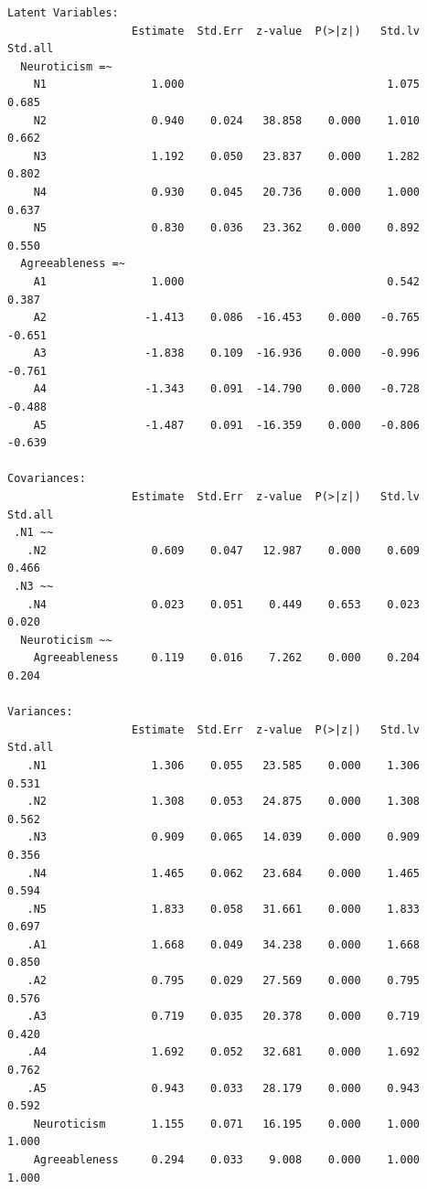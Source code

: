 \documentclass[
  letterpaper,
  DIV=11,
  numbers=noendperiod]{scrreprt}
\begin{document}
\begin{verbatim}
Latent Variables:
                   Estimate  Std.Err  z-value  P(>|z|)   Std.lv  Std.all
  Neuroticism =~                                                        
    N1                1.000                               1.075    0.685
    N2                0.940    0.024   38.858    0.000    1.010    0.662
    N3                1.192    0.050   23.837    0.000    1.282    0.802
    N4                0.930    0.045   20.736    0.000    1.000    0.637
    N5                0.830    0.036   23.362    0.000    0.892    0.550
  Agreeableness =~                                                      
    A1                1.000                               0.542    0.387
    A2               -1.413    0.086  -16.453    0.000   -0.765   -0.651
    A3               -1.838    0.109  -16.936    0.000   -0.996   -0.761
    A4               -1.343    0.091  -14.790    0.000   -0.728   -0.488
    A5               -1.487    0.091  -16.359    0.000   -0.806   -0.639

Covariances:
                   Estimate  Std.Err  z-value  P(>|z|)   Std.lv  Std.all
 .N1 ~~                                                                 
   .N2                0.609    0.047   12.987    0.000    0.609    0.466
 .N3 ~~                                                                 
   .N4                0.023    0.051    0.449    0.653    0.023    0.020
  Neuroticism ~~                                                        
    Agreeableness     0.119    0.016    7.262    0.000    0.204    0.204

Variances:
                   Estimate  Std.Err  z-value  P(>|z|)   Std.lv  Std.all
   .N1                1.306    0.055   23.585    0.000    1.306    0.531
   .N2                1.308    0.053   24.875    0.000    1.308    0.562
   .N3                0.909    0.065   14.039    0.000    0.909    0.356
   .N4                1.465    0.062   23.684    0.000    1.465    0.594
   .N5                1.833    0.058   31.661    0.000    1.833    0.697
   .A1                1.668    0.049   34.238    0.000    1.668    0.850
   .A2                0.795    0.029   27.569    0.000    0.795    0.576
   .A3                0.719    0.035   20.378    0.000    0.719    0.420
   .A4                1.692    0.052   32.681    0.000    1.692    0.762
   .A5                0.943    0.033   28.179    0.000    0.943    0.592
    Neuroticism       1.155    0.071   16.195    0.000    1.000    1.000
    Agreeableness     0.294    0.033    9.008    0.000    1.000    1.000
\end{verbatim}
\end{document}
